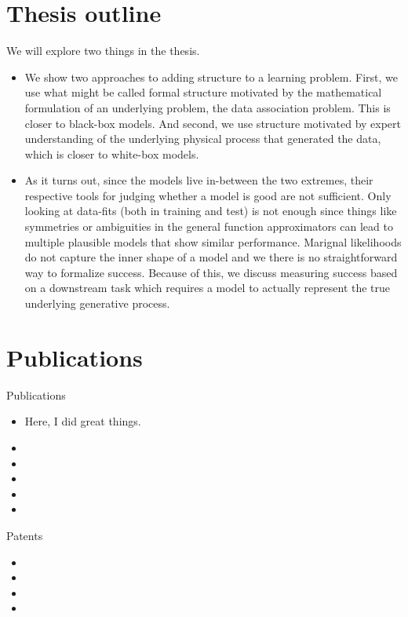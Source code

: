 \section{Thesis outline}
We will explore two things in the thesis.
\begin{itemize}
    \item We show two approaches to adding structure to a learning problem.
          First, we use what might be called formal structure motivated by the mathematical formulation of an underlying problem, the data association problem.
          This is closer to black-box models.
          And second, we use structure motivated by expert understanding of the underlying physical process that generated the data, which is closer to white-box models.
    \item As it turns out, since the models live in-between the two extremes, their respective tools for judging whether a model is good are not sufficient.
          Only looking at data-fits (both in training and test) is not enough since things like symmetries or ambiguities in the general function approximators can lead to multiple plausible models that show similar performance.
          Marignal likelihoods do not capture the inner shape of a model and we there is no straightforward way to formalize success.
          Because of this, we discuss measuring success based on a downstream task which requires a model to actually represent the true underlying generative process.
\end{itemize}


\section{Publications}
Publications
\begin{itemize}
    \item {}

          Here, I did great things.
    \item {}
    \item {}
    \item {}
    \item {}
    \item {}
\end{itemize}

Patents
\begin{itemize}
    \item {}
    \item {}
    \item {}
    \item {}
\end{itemize}
